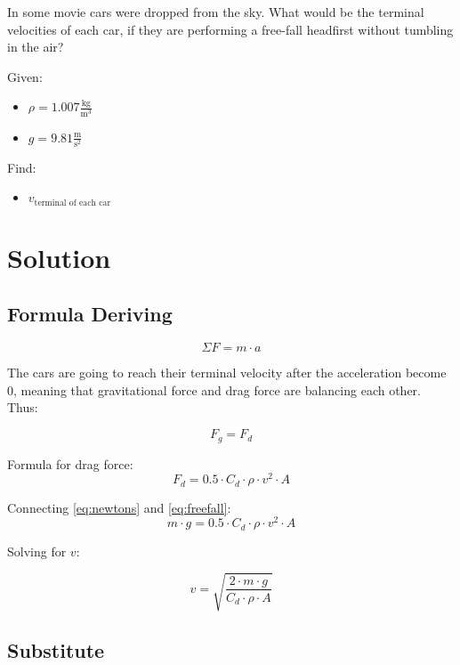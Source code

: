 
In some movie cars were dropped from the sky.
What would be the terminal velocities of each car, if they are
performing a free-fall headfirst without tumbling in the air?

\bigbreak Given:
\begin{itemize}
    \item $ \rho = 1.007 \frac{\text{kg}}{\text{m}^3} $
    \item $ g = 9.81 \frac{\text{m}}{\text{s}^2} $
\end{itemize}

Find:
\begin{itemize}
    \item $ v_{\text{terminal of each car}} $
\end{itemize}


\section*{Solution}
\subsection*{Formula Deriving}

\begin{equation}
    \label{eq:newtons}
    \Sigma F = m \cdot a
\end{equation}

The cars are going to reach their terminal velocity after the acceleration become 0,
meaning that gravitational force and drag force are balancing each other. Thus:

$$ F_g = F_d $$

Formula for drag force:
\begin{equation}
    \label{eq:freefall}
    F_d = 0.5 \cdot C_d \cdot \rho \cdot v^2 \cdot A
\end{equation}

Connecting \ref{eq:newtons} and \ref{eq:freefall}:
$$m \cdot g = 0.5 \cdot C_d \cdot \rho \cdot v^2 \cdot A $$

Solving for $v$:

\begin{equation}
    \label{eq:terminal}
    v = \sqrt{\frac{2 \cdot m \cdot g}{C_d \cdot \rho \cdot A}}
\end{equation}

\subsection*{Substitute}

